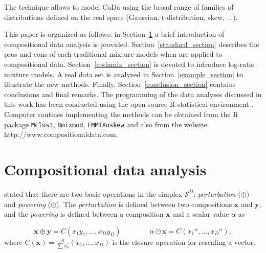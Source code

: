 \documentclass[12pt, a4paper]{article}
\begin{document}
The technique allows to model CoDa using the broad range of families of distributions defined on the real space (Gaussian, t-distribution, skew, ...).

This paper is organized as follows: in Section~\ref{coda_section} a brief introduction of compositional data analysis is provided. Section~\ref{standard_section} describes the pros and cons of each traditional mixture models when are applied to compositional data. Section~\ref{codamix_section} is devoted to introduce log-ratio mixture models. A real data set is analyzed in Section~\ref{example_section} to illustrate the new methods. Finally, Section~\ref{conclusion_section} contains conclusions and final remarks. The programming of the data analyses discussed in this work has been conducted using the open-source R statistical environment \citep{R2014soft}. Computer routines implementing the methods can be obtained from the R package \texttt{Mclust}, \texttt{Rmixmod}, \texttt{EMMIXuskew} and also from the website http://www.compositionaldata.com.






\section{Compositional data analysis}
\label{coda_section}


 \noindent \cite{aitchison1986statistical} stated that  there are two basic operations in the simplex $\mathcal{S}^D$: \emph{perturbation} ($\oplus$) and 
 \emph{powering} ($\odot$). The \emph{perturbation} is defined between two compositions $\textbf{x}$ 
and $\textbf{y}$,  and the \emph{powering} is defined between a composition $\textbf{x}$ and a scalar value $\alpha$ as

\begin{equation}
\textbf{x} \oplus \textbf{y} =  C( x_1 y_1, \dots, x_D y_D) \qquad\qquad \alpha
 \odot \textbf{x} =  C( {x_1}^\alpha, \dots, {x_D}^\alpha),
\label{pert_pow}
\end{equation}
where $C(\textbf{x})=\frac{\kappa}{\sum x_k}(x_1, \dots, x_D) $ is the closure operation for rescaling a vector.
\end{document}
